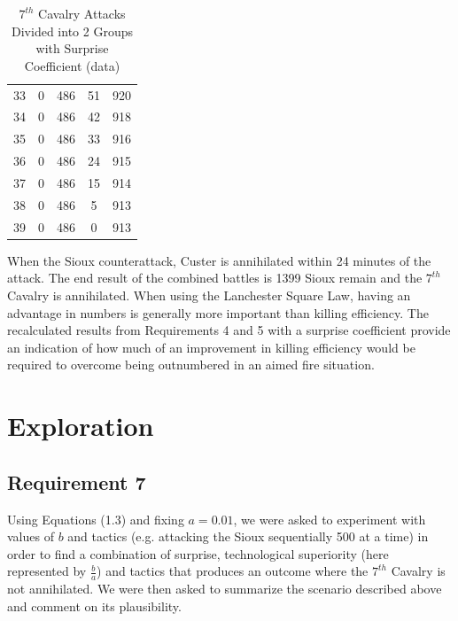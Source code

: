 \documentclass[letterpaper,10pt]{article}
\begin{document}
\begin{table}
\begin{center}
\begin{tabular}[h!tp]{ccccc}
33 &	0 &	486 &	51 &	920 \\
34 &	0 &	486 &	42 &	918 \\
35 &	0 &	486 &	33 &	916 \\
36 &	0 &	486 &	24 &	915 \\
37 &	0 &	486 &	15 &	914 \\
38 &	0 &	486 &	5 &	913 \\
39 &	0 &	486 &	0 &	913 \\
\hline
\end{tabular}
\end{center}
\caption{$7^{th}$ Cavalry Attacks Divided into 2 Groups with Surprise Coefficient (data)}
\label{tab6b}
\end{table}

When the Sioux counterattack, Custer is annihilated within 24 minutes of the attack.  The end result of the combined battles is 1399 Sioux remain and the $7^{th}$ Cavalry is annihilated.  When using the Lanchester Square Law, having an advantage in numbers is generally more important than killing efficiency.   The recalculated results from Requirements 4 and 5 with a surprise coefficient provide an indication of how much of an improvement in killing efficiency would be required to overcome being outnumbered in an aimed fire situation.

\section{Exploration}
\subsection{Requirement 7}
Using Equations (1.3) and fixing $a = 0.01$, we were asked to experiment with values of $b$ and tactics (e.g. attacking the Sioux sequentially 500 at a time) in order to find a combination of surprise, technological superiority (here represented by $\frac{b}{a}$) and tactics that produces an outcome where the $7^{th}$ Cavalry is not annihilated. We were then asked to summarize the scenario described above and comment on its plausibility.   
\end{document}
